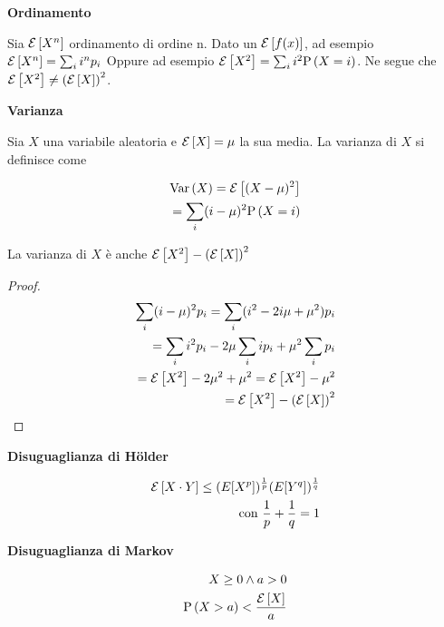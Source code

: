 \begin{defn}
	\textbf{Ordinamento}
	
	Sia $\mathcal{E}\left[X^n\right]$ ordinamento di ordine n.
	Dato un $ \mathcal{E}\left[f(x)\right] $, ad esempio $ \mathcal{E}\left[X^n\right] = \sum_i i^n p_i$
	Oppure ad esempio $ \mathcal{E}\left[X^2\right] = \sum_i i^2 \text{P}\left(X = i\right)$. Ne segue che $ \mathcal{E}\left[X^2\right] \neq \left(\mathcal{E}\left[X\right]\right)^2$.	
\end{defn}


\begin{defn}
	\textbf{Varianza}
	
	Sia $ X $ una variabile aleatoria e $ \mathcal{E}\left[X\right] = \mu $ la sua media.
	La varianza di $ X $ si definisce come 
	
	\begin{equation*}
	\begin{aligned}
	\text{Var}\left(X\right) = \mathcal{E}\left[(X-\mu)^2\right] \\ 
	= \sum_i (i-\mu)^2 \text{P}\left(X = i\right)
	\end{aligned}
	\end{equation*}
	
	La varianza di $ X $ è anche $ \mathcal{E}\left[X^2\right] - \left(\mathcal{E}\left[X\right]\right)^2 $
	
	\begin{proof}
		\begin{equation*}
		\begin{aligned}
		\sum_i (i-\mu)^2 p_i = \sum_i (i^2 -2i\mu + \mu^2) p_i \\
		= \sum_i i^2 p_i - 2\mu \sum_i i p_i + \mu^2 \sum_i p_i \\
		= \mathcal{E}\left[X^2\right] - 2\mu^2 + \mu^2 = \mathcal{E}\left[X^2\right] - \mu^2 \\
		= \mathcal{E}\left[X^2\right] - \left(\mathcal{E}\left[X\right]\right)^2 
		\end{aligned}
		\end{equation*}
	\end{proof}
\end{defn}



\begin{defn}
	\textbf{Disuguaglianza di Hölder}
	
	\begin{equation}
		\begin{aligned}
		\mathcal{E}\left[X \cdot Y\right] \leq (E[X^p])^{\frac{1}{p}} (E[Y^q])^{\frac{1}{q}} \\
		\text{con } \dfrac{1}{p} + \dfrac{1}{q} = 1
		\end{aligned}
	\end{equation}
\end{defn}


\begin{defn}
	\textbf{Disuguaglianza di Markov}
	
	\begin{equation}
		\begin{aligned}
		X \geq 0 \land a > 0 \\
		\text{P}\left(X > a\right) < \dfrac{\mathcal{E}\left[X\right]}{a}
		\end{aligned}
	\end{equation}
\end{defn}

